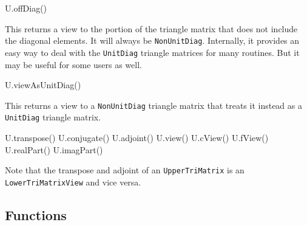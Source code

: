 \documentclass[twoside,letterpaper,11pt]{article}
\renewcommand{\tt}[1]{{\lstinline {#1}}}
\begin{document}
\begin{tmvcode}
U.offDiag()
\end{tmvcode}
This returns a view to the portion of the triangle matrix that does not include
the diagonal elements.  It will always be \tt{NonUnitDiag}.
Internally, it provides an easy way to deal with the \tt{UnitDiag} triangle matrices
for many routines.  But it may be useful for some users as well.

\begin{tmvcode}
U.viewAsUnitDiag()
\end{tmvcode}
This returns a view to a \tt{NonUnitDiag} triangle matrix that treats it
instead as a \tt{UnitDiag} triangle matrix.

\begin{tmvcode}
U.transpose()
U.conjugate()
U.adjoint()
U.view()
U.cView()
U.fView()
U.realPart()
U.imagPart()
\end{tmvcode}
Note that the transpose and adjoint of an \tt{UpperTriMatrix} is an
\tt{LowerTriMatrixView} and vice versa.
\vspace{12pt}

\subsection{Functions}
\label{TriMatrix_Functions}
\end{document}
